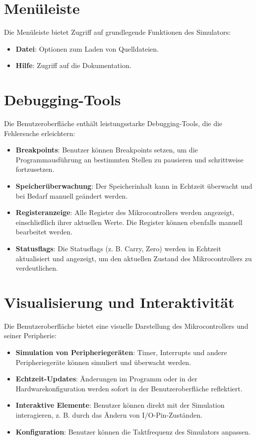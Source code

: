 \section{Menüleiste}
Die Menüleiste bietet Zugriff auf grundlegende Funktionen des Simulators:
\begin{itemize}
    \item \textbf{Datei}: Optionen zum Laden von Quelldateien.
    \item \textbf{Hilfe}: Zugriff auf die Dokumentation.
\end{itemize}

\section{Debugging-Tools}
Die Benutzeroberfläche enthält leistungsstarke Debugging-Tools, die die Fehlersuche erleichtern:
\begin{itemize}
    \item \textbf{Breakpoints}: Benutzer können Breakpoints setzen, um die Programmausführung an bestimmten Stellen zu pausieren und schrittweise fortzusetzen.
    \item \textbf{Speicherüberwachung}: Der Speicherinhalt kann in Echtzeit überwacht und bei Bedarf manuell geändert werden.
    \item \textbf{Registeranzeige}: Alle Register des Mikrocontrollers werden angezeigt, einschließlich ihrer aktuellen Werte. Die Register können ebenfalls manuell bearbeitet werden.
    \item \textbf{Statusflags}: Die Statusflags (z. B. Carry, Zero) werden in Echtzeit aktualisiert und angezeigt, um den aktuellen Zustand des Mikrocontrollers zu verdeutlichen.
\end{itemize}

\section{Visualisierung und Interaktivität}
Die Benutzeroberfläche bietet eine visuelle Darstellung des Mikrocontrollers und seiner Peripherie:
\begin{itemize}
    \item \textbf{Simulation von Peripheriegeräten}: Timer, Interrupts und andere Peripheriegeräte können simuliert und überwacht werden.
    \item \textbf{Echtzeit-Updates}: Änderungen im Programm oder in der Hardwarekonfiguration werden sofort in der Benutzeroberfläche reflektiert.
    \item \textbf{Interaktive Elemente}: Benutzer können direkt mit der Simulation interagieren, z. B. durch das Ändern von I/O-Pin-Zuständen.
    \item \textbf{Konfiguration}: Benutzer können die Taktfrequenz des Simulators anpassen.
\end{itemize}

